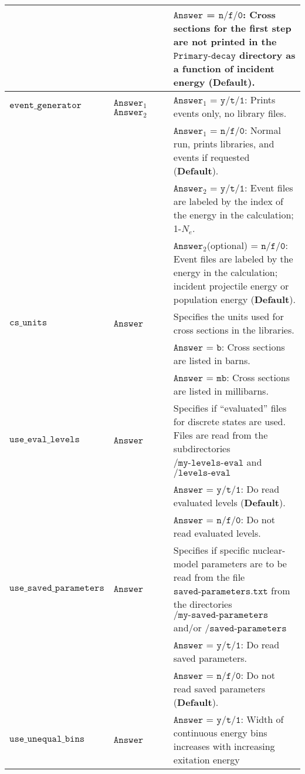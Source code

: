 \documentclass[
10pt,
showpacs,preprintnumbers,footinbib,
amsfonts,amsmath,amssymb,
aps,
prc,twocolumn,groupedaddress,superscriptaddress,
showkeys,
nofootinbib
]{revtex4-1}
\begin{document}
\begin{center}
\begin{tabular}{| p{4cm} | p{4cm} | p{9cm} |}
  &  &  ${\texttt{Answer}}$ = ${\texttt{n/f/0}}$: Cross sections for the first step are {\bf not} printed in the ${\texttt{Primary-decay}}$ directory as a function of incident energy ({\bf Default}). \\
\hline
${\texttt{event\_generator}}$ & ${\texttt{Answer}}_1$~~~${\texttt{Answer}}_2$ & ${\texttt{Answer}}_1$ = ${\texttt{y/t/1}}$: Prints events only, no library files. \\
   &    & ${\texttt{Answer}}_1$ = ${\texttt{n/f/0}}$: Normal run, prints libraries, and events if requested ({\bf Default}). \\
   &    & ${\texttt{Answer}}_2$ = ${\texttt{y/t/1}}$: Event files are labeled by the index of the energy in the calculation; 1-$N_e$. \\
   &    & ${\texttt{Answer}}_2$(optional) = ${\texttt{n/f/0}}$: Event files are labeled by the energy in the calculation; incident projectile energy or population energy ({\bf Default}). \\
\hline
${\texttt{cs\_units}}$ & ${\texttt{Answer}}$ & Specifies the units used for cross sections in the libraries.\\
& & ${\texttt{Answer}}$ = ${\texttt{b}}$: Cross sections are listed in barns.\\
& & ${\texttt{Answer}}$ = ${\texttt{mb}}$: Cross sections are listed in millibarns.\\
\hline
${\texttt{use\_eval\_levels}}$ & ${\texttt{Answer}}$ & Specifies if ``evaluated'' files for discrete states are used. Files are read from the subdirectories
    ${\texttt{/my-levels-eval}}$ and ${\texttt{/levels-eval}}$\\
& & ${\texttt{Answer}}$ = ${\texttt{y/t/1}}$: Do read evaluated levels ({\bf Default}).\\
& & ${\texttt{Answer}}$ = ${\texttt{n/f/0}}$: Do not read evaluated levels. \\
\hline
${\texttt{use\_saved\_parameters}}$ & ${\texttt{Answer}}$ & Specifies if specific nuclear-model parameters are to be read from the file ${\texttt{saved-parameters.txt}}$ from the directories ${\texttt{/my-saved-parameters}}$ and/or ${\texttt{/saved-parameters}}$\\
& & ${\texttt{Answer}}$ = ${\texttt{y/t/1}}$: Do read saved parameters.\\
& & ${\texttt{Answer}}$ = ${\texttt{n/f/0}}$: Do not read saved parameters ({\bf Default}). \\
\hline
${\texttt{use\_unequal\_bins}}$ & ${\texttt{Answer}}$ & ${\texttt{Answer}}$ = ${\texttt{y/t/1}}$: Width of continuous energy bins increases with increasing exitation energy \\

\end{tabular}
\end{center}
\end{document}
